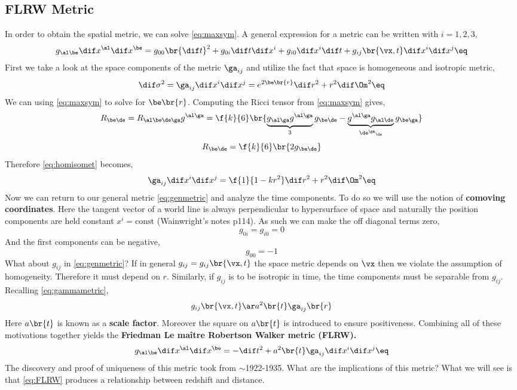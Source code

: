\documentclass{article}
\begin{document}
\subsection{FLRW Metric}
In order to obtain the spatial metric, we can solve \eqref{eq:maxsym}. A general expression for a metric can be written with $i = 1,2,3$,
\[ g_{\al\be} \dif x^\al \dif x^\be = g_{00}\br{\dif t}^2 + g_{0i}\dif t \dif x^i + g_{i0} \dif x^i \dif t + g_{ij}\br{\vx,t}\dif x^i \dif x^j \eq \label{eq:genmetric}\]
First we take a look at the space components of the metric $\ga_{ij}$ and utilize the fact that space is homogeneous and isotropic metric,
\[ \dif \sigma^2 = \ga_{ij} \dif x^i \dif x^j = e^{2 \be \br{r}} \dif r^2 + r^2 \dif \Om^2 \eq \label{eq:homisomet} \]
We can using \eqref{eq:maxsym} to solve for $\be \br{r}$. Computing the Ricci tensor from \eqref{eq:maxsym} gives,
\[ R_{\be \de} = R_{\al\be\de\ga} g^{\al\ga} = \f{k}{6}\br{\underbrace{g_{\al\ga} g^{\al\ga}}_{3} g_{\be\de} - \underbrace{g^{\al\ga} g_{\al\de}}_{{\de^\ga}_\de} g_{\be\ga}} \]
\[ R_{\be \de} = \f{k}{6} \br{2 g_{\be \de}} \]
Therefore \eqref{eq:homisomet} becomes,
\[ \ga_{ij} \dif x^i \dif x^j = \f{1}{1 - k r^2} \dif r^2 + r^2 \dif \Om^2 \eq\label{eq:gammametric}\]
Now we can return to our general metric \eqref{eq:genmetric} and analyze the time components. To do so we will use the notion of \textbf{comoving coordinates}. Here the tangent vector of a world line is always perpendicular to hypersurface of space and naturally the position components are held constant $x^i = \text{const}$ (Wainwright's notes p114). As such we can make the off diagonal terms zero,
\[ g_{0i} = g_{i0} = 0 \]
And the first components can be negative,
\[ g_{00} = -1 \]
What about $g_{ij}$ in \eqref{eq:genmetric}? If in general $g_{ij} = g_{ij}\br{\vx, t}$ the space metric depends on $\vx$ then we violate the assumption of homogeneity. Therefore it must depend on $r$. Similarly, if $g_{ij}$ is to be isotropic in time, the time components must be separable from $g_{ij}$. Recalling \eqref{eq:gammametric},
\[ g_{ij}\br{\vx, t} \ar a^2 \br{t} \ga_{ij}\br{r} \]
Here $a\br{t}$ is known as a \textbf{scale factor}. Moreover the square on $a\br{t}$ is introduced to ensure positiveness. Combining all of these motivations together yields the \textbf{Friedman Le maître Robertson Walker metric (FLRW).}
\[ g_{\al\be} \dif x^\al \dif x^\be = -\dif t^2 + a^2\br{t} \ga_{ij} \dif x^i \dif x^j \eq \label{eq:FLRW} \]
The discovery and proof of uniqueness of this metric took from $\sim$1922-1935. What are the implications of this metric? What we will see is that \eqref{eq:FLRW} produces a relationship between redshift and distance.
\end{document}
